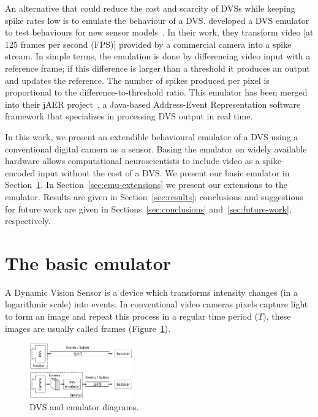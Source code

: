 \documentclass[conference]{IEEEtran}
\begin{document}
An alternative that could reduce the cost and scarcity of DVSs while keeping spike rates low is to emulate the behaviour of a DVS. \citeauthor{DVSemu} developed a DVS emulator to test behaviours for new sensor models~\cite{DVSemu}. In their work, they transform video [at 125 frames per second (FPS)] provided by a commercial camera into a spike stream. In simple terms, the emulation is done by differencing video input with a reference frame; if this difference is larger than a threshold it produces an output and updates the reference. The number of spikes produced per pixel is proportional to the difference-to-threshold ratio. This emulator has been merged into their jAER project~\cite{delbruck2008frame}, a Java-based Address-Event Representation software framework that specializes in processing DVS output in real time.

In this work, we present an extendible behavioural emulator of a DVS using a conventional digital camera as a sensor. Basing the emulator on widely available hardware allows computational neuroscientists to include video as a spike-encoded input without the cost of a DVS. We present our basic emulator in Section~\ref{sec:basic-emulator}. In Section~\ref{sec:emu-extensions} we present our extensions to the emulator. Results are given in Section~\ref{sec:results}; conclusions and suggestions for future work are given in Sections~\ref{sec:conclusions} and~\ref{sec:future-work}, respectively.


\section{The basic emulator}
\label{sec:basic-emulator}
A Dynamic Vision Sensor is a device which transforms intensity changes (in a logarithmic scale) into events. In conventional video cameras pixels capture light to form an image and repeat this process in a regular time period ($T$), these images are usually called frames (Figure~\ref{fig:dvs_vs_emu}).

\begin{figure}[htb]
  \centering
  \includegraphics[width=0.4\textwidth]{dvs_vs_emu_diagram}
  \caption{DVS and emulator diagrams.}
  \label{fig:dvs_vs_emu}
\end{figure}
\end{document}
